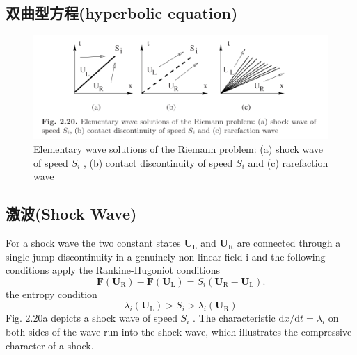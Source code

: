\documentclass{book}
\begin{document}
\begin{example}
\begin{example}{}{}
\begin{example}
\begin{example}
\begin{example}
\section{双曲型方程(hyperbolic equation)}
\begin{figure}[htp]
    \centering
    \label{fig:间断波}
    \includegraphics[width=0.7\linewidth]{fig/间断波.png}
    \caption{Elementary wave solutions of the Riemann problem: (a) shock wave of speed  $S_{i}$ , (b) contact discontinuity of speed  $S_{i}$  and (c) rarefaction wave}
\end{figure}

\subsection{激波(Shock Wave)}
For a shock wave the two constant states  $\mathbf{U}_{\mathrm{L}}$  and  $\mathbf{U}_{\mathrm{R}}$  are connected through a single jump discontinuity in a genuinely non-linear field  i  and the following conditions apply
the Rankine-Hugoniot conditions
\begin{equation}
    \mathbf{F}\left(\mathbf{U}_{\mathrm{R}}\right)-\mathbf{F}\left(\mathbf{U}_{\mathrm{L}}\right)=S_{i}\left(\mathbf{U}_{\mathrm{R}}-\mathbf{U}_{\mathrm{L}}\right) .
\end{equation}
the entropy condition
\begin{equation}
    \lambda_{i}\left(\mathbf{U}_{\mathrm{L}}\right)>S_{i}>\lambda_{i}\left(\mathbf{U}_{\mathrm{R}}\right)
\end{equation}
Fig. 2.20a depicts a shock wave of speed  $S_{i}$ . The characteristic  $\mathrm{d} x / \mathrm{d} t=\lambda_{i}$  on both sides of the wave run into the shock wave, which illustrates the compressive character of a shock.

\end{example}
\end{example}
\end{example}
\end{example}
\end{example}
\end{document}
